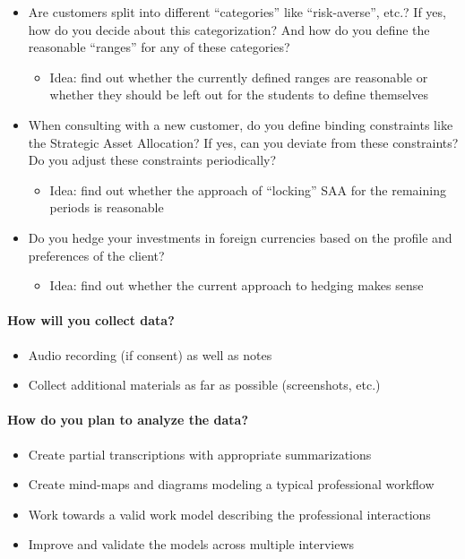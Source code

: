 \begin{itemize}
\begin{itemize}
  \end{itemize}
  \item Are customers split into different “categories” like “risk-averse”, etc.? If yes, how do you decide about this categorization? And how do you define the reasonable “ranges” for any of these categories?
  \begin{itemize}
    \item Idea: find out whether the currently defined ranges are reasonable or whether they should be left out for the students to define themselves
  \end{itemize}
  \item When consulting with a new customer, do you define binding constraints like the Strategic Asset Allocation? If yes, can you deviate from these constraints? Do you adjust these constraints periodically?
  \begin{itemize}
    \item Idea: find out whether the approach of “locking” SAA for the remaining periods is reasonable
  \end{itemize}
  \item Do you hedge your investments in foreign currencies based on the profile and preferences of the client?
  \begin{itemize}
    \item Idea: find out whether the current approach to hedging makes sense
  \end{itemize}
\end{itemize}

\paragraph{How will you collect data?}
\begin{itemize}
  \item Audio recording (if consent) as well as notes
  \item Collect additional materials as far as possible (screenshots, etc.)
\end{itemize}

\paragraph{How do you plan to analyze the data?}
\begin{itemize}
  \item Create partial transcriptions with appropriate summarizations
  \item Create mind-maps and diagrams modeling a typical professional workflow
  \item Work towards a valid work model describing the professional interactions
  \item Improve and validate the models across multiple interviews
\end{itemize}

